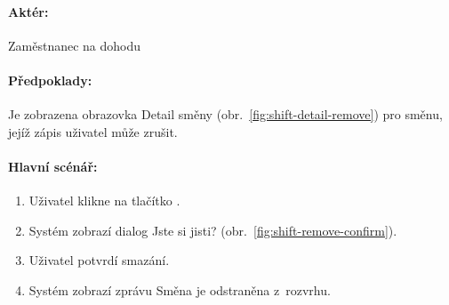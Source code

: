 \documentclass[twoside]{ctuthesis}
\begin{document}
\paragraph{Aktér:} Zaměstnanec na dohodu
\paragraph{Předpoklady:} Je zobrazena obrazovka Detail směny (obr.~\ref{fig:shift-detail-remove}) pro směnu, jejíž zápis uživatel může zrušit.
\paragraph{Hlavní scénář:}
\begin{enumerate}
	\item Uživatel klikne na tlačítko .
	\item Systém zobrazí dialog Jste si jisti? (obr.~\ref{fig:shift-remove-confirm}).
	\item Uživatel potvrdí smazání.
	\item Systém zobrazí zprávu  Směna je odstraněna z~rozvrhu.
\end{enumerate}
\end{document}
